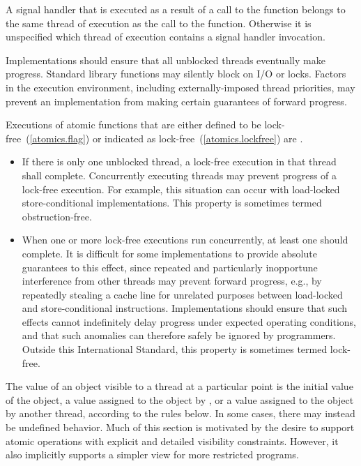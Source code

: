 \pnum
A signal handler that is executed as a result of a call to the 
function belongs to the same thread of execution as the call to the
 function. Otherwise it is unspecified which thread of execution
contains a signal handler invocation.

\pnum
Implementations should ensure that all unblocked threads eventually make
progress. \enternote Standard library functions may silently block on I/O or
locks. Factors in the execution environment, including externally-imposed thread
priorities, may prevent an implementation from making certain guarantees of
forward progress. \exitnote

\pnum
Executions of atomic functions
that are either defined to be lock-free~(\ref{atomics.flag})
or indicated as lock-free~(\ref{atomics.lockfree})
are .
\begin{itemize}
\item
  If there is only one unblocked thread,
  a lock-free execution in that thread shall complete.
  \enternote
    Concurrently executing threads
    may prevent progress of a lock-free execution.
    For example,
    this situation can occur
    with load-locked store-conditional implementations.
    This property is sometimes termed obstruction-free.
  \exitnote
\item
  When one or more lock-free executions run concurrently,
  at least one should complete.
  \enternote
    It is difficult for some implementations
    to provide absolute guarantees to this effect,
    since repeated and particularly inopportune interference
    from other threads
    may prevent forward progress,
    e.g.,
    by repeatedly stealing a cache line
    for unrelated purposes
    between load-locked and store-conditional instructions.
    Implementations should ensure
    that such effects cannot indefinitely delay progress
    under expected operating conditions,
    and that such anomalies
    can therefore safely be ignored by programmers.
    Outside this International Standard,
    this property is sometimes termed lock-free.
  \exitnote
\end{itemize}

\pnum
The value of an object visible to a thread  at a particular point is the
initial value of the object, a value assigned to the object by , or a
value assigned to the object by another thread, according to the rules below.
\enternote In some cases, there may instead be undefined behavior. Much of this
section is motivated by the desire to support atomic operations with explicit
and detailed visibility constraints. However, it also implicitly supports a
simpler view for more restricted programs. \exitnote

